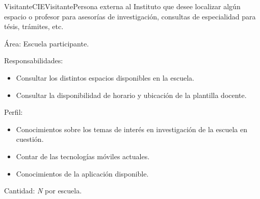 \begin{actor}{Visitante}{CIEVisitante}{Persona externa al Instituto que desee localizar algún espacio o profesor para asesorías de investigación, consultas de especialidad para tésis, trámites, etc.}

    \item[Área:] Escuela participante.
    \item[Responsabilidades:] \hspace{1pt}

	\begin{itemize}

		  \item Consultar los distintos espacios disponibles en la escuela.
		  \item Consultar la disponibilidad de horario y ubicación de la plantilla docente.
	  
    \end{itemize}

    \item[Perfil:] \hspace{1pt}

	\begin{itemize}

	    \item Conocimientos sobre los temas de interés en investigación de la escuela en cuestión.
	    \item Contar de las tecnologías móviles actuales.
	    \item Conocimientos de la aplicación disponible.

	\end{itemize}

    \item[Cantidad:] \textit{N} por escuela.

\end{actor}

